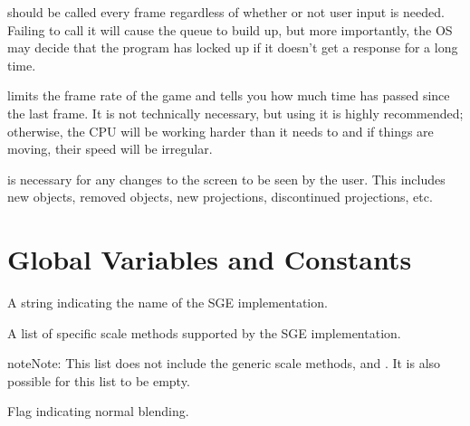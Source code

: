 \documentclass[letterpaper,10pt,english]{sphinxmanual}
\begin{document}
{\hyperref[dsp:sge.dsp.Game.pump_input]{\emph{}}} should be called every frame regardless
of whether or not user input is needed.  Failing to call it will cause
the queue to build up, but more importantly, the OS may decide that the
program has locked up if it doesn't get a response for a long time.

{\hyperref[dsp:sge.dsp.Game.regulate_speed]{\emph{}}} limits the frame rate of the game
and tells you how much time has passed since the last frame.  It is not
technically necessary, but using it is highly recommended; otherwise,
the CPU will be working harder than it needs to and if things are
moving, their speed will be irregular.

{\hyperref[dsp:sge.dsp.Game.refresh]{\emph{}}} is necessary for any changes to the screen
to be seen by the user.  This includes new objects, removed objects, new
projections, discontinued projections, etc.


\section{Global Variables and Constants}
\label{sge:global-variables-and-constants}

\begin{fulllineitems}
\label{sge:sge.sge.IMPLEMENTATION}
A string indicating the name of the SGE implementation.

\end{fulllineitems}


\begin{fulllineitems}
\label{sge:sge.sge.SCALE_METHODS}
A list of specific scale methods supported by the SGE implementation.

\begin{notice}{note}{Note:}
This list does not include the generic scale methods, 
and .  It is also possible for this list to be empty.
\end{notice}

\end{fulllineitems}


\begin{fulllineitems}
\label{sge:sge.sge.BLEND_NORMAL}
Flag indicating normal blending.

\end{fulllineitems}
\end{document}
